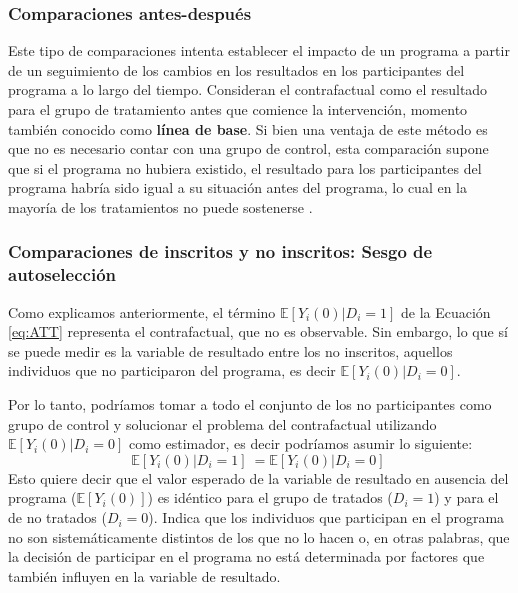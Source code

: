 \documentclass[../../main.tex]{subfiles}
\begin{document}
\subsubsection{Comparaciones antes-después}
Este tipo de comparaciones intenta establecer el impacto de un programa a partir de un
seguimiento de los cambios en los resultados en los participantes del programa a lo largo
del tiempo. Consideran el contrafactual como el resultado para el grupo de tratamiento
antes que comience la intervención, momento también conocido como \textbf{línea de base}.
Si bien una ventaja de este método es que no es necesario contar con una grupo de
control, esta comparación supone que si el programa no hubiera existido, el resultado para
los participantes del programa habría sido igual a su situación antes del programa, lo
cual en la mayoría de los tratamientos no puede sostenerse \cite{gertler-2016}.

\subsubsection{Comparaciones de inscritos y no inscritos: Sesgo de autoselección}
Como explicamos anteriormente, el término \(\mathbb{E} \left[Y_i(0)|D_i=1\right]\) de la
Ecuación \ref{eq:ATT} representa el contrafactual, que no es observable. Sin embargo, lo
que sí se puede medir es la variable de resultado entre los no inscritos, aquellos
individuos que no participaron del programa, es decir \(\mathbb{E}
\left[Y_i(0)|D_i=0\right]\).

Por lo tanto, podríamos tomar a todo el conjunto de los no participantes como grupo de
control y solucionar el problema del contrafactual utilizando \(\mathbb{E}
\left[Y_i(0)|D_i=0\right]\) como estimador, es decir podríamos asumir lo siguiente:
\begin{equation}
    \mathbb{E} \left[Y_i(0)|D_i=1\right]\ = \mathbb{E} \left[Y_i(0)|D_i=0\right]\
    \label{eq:supuesto-1}  %
\end{equation}
Esto quiere decir que el valor esperado de la variable de resultado en ausencia del
programa (\(\mathbb{E}\left[Y_i(0)\right]\)) es idéntico para el grupo de tratados (\(D_i =
1\)) y para el de no tratados (\(D_i = 0\)). Indica que los individuos que participan en el
programa no son sistemáticamente distintos de los que no lo hacen \cite{bernal} o, en
otras palabras, que la decisión de participar en el programa no está determinada por
factores que también influyen en la variable de resultado.
\end{document}
